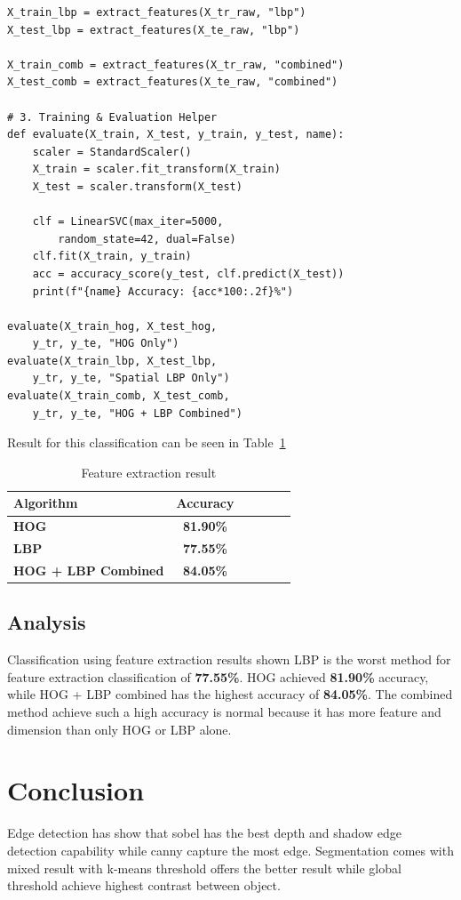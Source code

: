 \documentclass[a4paper,10pt]{article}
\begin{document}
\begin{verbatim}
X_train_lbp = extract_features(X_tr_raw, "lbp")
X_test_lbp = extract_features(X_te_raw, "lbp")

X_train_comb = extract_features(X_tr_raw, "combined")
X_test_comb = extract_features(X_te_raw, "combined")

# 3. Training & Evaluation Helper
def evaluate(X_train, X_test, y_train, y_test, name):
    scaler = StandardScaler()
    X_train = scaler.fit_transform(X_train)
    X_test = scaler.transform(X_test)
    
    clf = LinearSVC(max_iter=5000, 
        random_state=42, dual=False)
    clf.fit(X_train, y_train)
    acc = accuracy_score(y_test, clf.predict(X_test))
    print(f"{name} Accuracy: {acc*100:.2f}%")

evaluate(X_train_hog, X_test_hog, 
    y_tr, y_te, "HOG Only")
evaluate(X_train_lbp, X_test_lbp, 
    y_tr, y_te, "Spatial LBP Only")
evaluate(X_train_comb, X_test_comb, 
    y_tr, y_te, "HOG + LBP Combined")
\end{verbatim}

Result for this classification can be seen in Table~\ref*{tab:feature_extraction}
\begin{table}[H]
    \centering
    \footnotesize
    \caption{Feature extraction result}\label{tab:feature_extraction}
    \begin{tabular}{@{}lccccc@{}}
        \toprule
        \textbf{Algorithm} & \textbf{Accuracy} \\
        \midrule
        \textbf{HOG}   & \textbf{81.90\%} \\
        \textbf{LBP}   & \textbf{77.55\%} \\
        \textbf{HOG + LBP Combined}     & \textbf{84.05\%} \\
        \bottomrule
    \end{tabular}
\end{table}

\subsection{Analysis}
Classification using feature extraction results shown LBP is the worst method for feature extraction classification of \textbf{77.55\%}.
HOG achieved \textbf{81.90\%} accuracy, while HOG + LBP combined has the highest accuracy of \textbf{84.05\%}.
The combined method achieve such a high accuracy is normal because it has more feature and dimension than only HOG or LBP alone.

\section{Conclusion}
Edge detection has show that sobel has the best depth and shadow edge detection capability while canny capture the most edge.
Segmentation comes with mixed result with k-means threshold offers the better result while global threshold achieve highest contrast between object.
\end{document}
